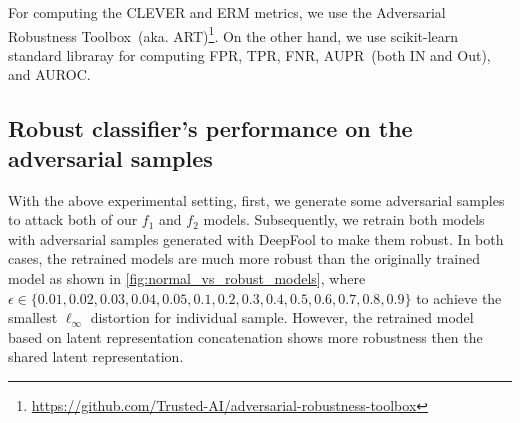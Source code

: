 \hspace*{3.5mm} For computing the CLEVER and ERM metrics, we use the Adversarial Robustness Toolbox~(aka. ART)\footnote{\url{https://github.com/Trusted-AI/adversarial-robustness-toolbox}}. On the other hand, we use scikit-learn standard libraray for computing FPR, TPR, FNR, AUPR~(both IN and Out), and AUROC. 

\subsection{Robust classifier's performance on the adversarial samples}
With the above experimental setting, first, we generate some adversarial samples to attack both of our $f_1$ and $f_2$ models. Subsequently, we retrain both models with adversarial samples generated with DeepFool to make them robust. In both cases, the retrained models are much more robust than the originally trained model as shown in \cref{fig:normal_vs_robust_models}, where $\epsilon \in\{0.01, 0.02, 0.03, 0.04, 0.05, 0.1, 0.2, 0.3, 0.4, 0.5, 0.6, 0.7, 0.8, 0.9\}$ to achieve the smallest $\ell_{\infty}$ distortion for individual sample. However, the retrained model based on latent representation concatenation shows more robustness then the shared latent representation. 

